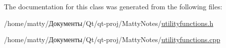 The documentation for this class was generated from the following files\+:\begin{DoxyCompactItemize}
\item 
/home/matty/Документы/\+Qt/qt-\/proj/\+Matty\+Notes/\hyperlink{utilityfunctions_8h}{utilityfunctions.\+h}\item 
/home/matty/Документы/\+Qt/qt-\/proj/\+Matty\+Notes/\hyperlink{utilityfunctions_8cpp}{utilityfunctions.\+cpp}\end{DoxyCompactItemize}
